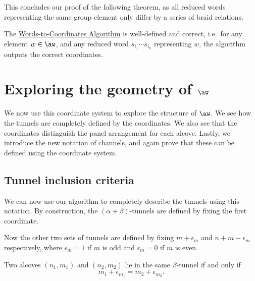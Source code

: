 \documentclass[11pt]{article}
\begin{document}
This concludes our proof of the following theorem,  as all reduced words representing the same group element only differ by a series of braid relations. 

\begin{theorem}
    The \hyperref[algorithm]{Words-to-Coordinates Algorithm} is well-defined and correct, i.e.\ for any element $w\in \aw$, and any reduced word $s_{i_1}\cdots s_{i_k}$ representing $w$, the algorithm outputs the correct coordinates. 
\end{theorem}























\section{Exploring the geometry of $\aw$}\label{sect5}

We now use this coordinate system to explore the structure of $\aw$. We see how the tunnels are completely defined by the coordinates. We also see that the coordinates distinguish the panel arrangement for each alcove. Lastly, we introduce the new notation of channels, and again prove that these can be defined using the coordinate system. 

\subsection{Tunnel inclusion criteria}
We can now use our algorithm to completely describe the tunnels using this notation. By construction, the $(\alpha+\beta)$-tunnels are defined by fixing the first coordinate.

Now the other two sets of tunnels are defined by fixing $m+\epsilon_m$ and $n+m-\epsilon_m$ respectively, where $\epsilon_m=1$ if $m$ is odd and $\epsilon_m=0$ if $m$ is even. 


\begin{lemma}\label{betatunnels}
    Two alcoves $(n_1,m_1)$ and $(n_2,m_2)$ lie in the same $\beta$-tunnel if and only if 
    \[m_1+\epsilon_{m_1}=m_2+\epsilon_{m_2}.\]
\end{lemma}
\end{document}
